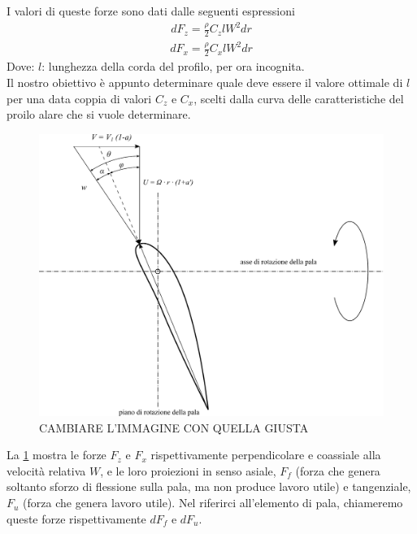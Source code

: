 I valori di queste forze sono dati dalle seguenti espressioni
\begin{align*}
dF_z = \frac{\rho}{2} C_z l W^2 dr
\end{align*}
\begin{align*}
dF_x = \frac{\rho}{2} C_x l W^2 dr
\end{align*}
Dove:
$l$: lunghezza della corda del profilo, per ora incognita.\\[2mm]
Il nostro obiettivo è appunto determinare quale deve essere il valore ottimale di $l$ per una data coppia di valori $C_z$ e $C_x$, scelti dalla curva delle caratteristiche del proilo alare che si vuole determinare. 
\begin{figure}[h!]
\centering
  \includegraphics[width=.7\textwidth]{fig/triangEol2.pdf}
\caption{CAMBIARE L'IMMAGINE CON QUELLA GIUSTA}
\label{fig:forzeEol}
\end{figure}
La \ref{fig:forzeEol} mostra le forze $F_z$ e $F_x$ rispettivamente perpendicolare e coassiale alla velocità relativa $W$, e le loro proiezioni in senso asiale, $F_f$ (forza che genera soltanto sforzo di flessione sulla pala, ma non produce lavoro utile) e tangenziale, $F_u$ (forza che genera lavoro utile). Nel riferirci all'elemento di pala, chiameremo queste forze rispettivamente $dF_f$ e $dF_u$.

